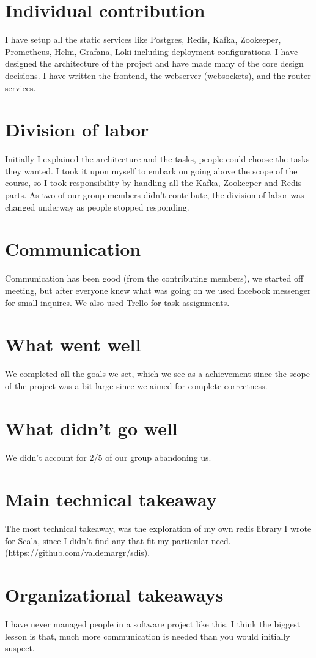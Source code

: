 \documentclass[12pt]{article}
\begin{document}


\section{Individual contribution}
I have setup all the static services like Postgres, Redis, Kafka, Zookeeper, Prometheus, Helm, Grafana, Loki including deployment configurations.
I have designed the architecture of the project and have made many of the core design decisions.
I have written the frontend, the webserver (websockets), and the router services.
\section{Division of labor}
    Initially I explained the architecture and the tasks, people could choose the tasks they wanted.
    I took it upon myself to embark on going above the scope of the course, so I took responsibility by handling all the Kafka, Zookeeper and Redis parts.
    As two of our group members didn't contribute, the division of labor was changed underway as people stopped responding.
\section{Communication}
    Communication has been good (from the contributing members), we started off meeting, but after everyone knew what was going on we used facebook messenger for small inquires.
    We also used Trello for task assignments.
\section{What went well}
    We completed all the goals we set, which we see as a achievement since the scope of the project was a bit large since we aimed for complete correctness.
\section{What didn't go well}
    We didn't account for 2/5 of our group abandoning us.
\section{Main technical takeaway}
    The most technical takeaway, was the exploration of my own redis library I wrote for Scala, since I didn't find any that fit my particular need.
    (https://github.com/valdemargr/sdis).
\section{Organizational takeaways}
    I have never managed people in a software project like this.
    I think the biggest lesson is that, much more communication is needed than you would initially suspect.

\clearpage
\end{document}
